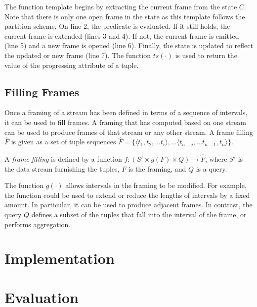 \documentclass{vldb}
\begin{document}
The function template begins by extracting the current frame from the state $C$. Note that there is only one open frame in the state as this template follows the partition scheme. On line 2, the predicate is evaluated. If it still holds, the current frame is extended (lines 3 and 4). If not, the current frame is emitted (line 5) and a new frame is opened (line 6). Finally, the state is updated to reflect the updated or new frame (line 7). The function $ts(\cdot)$ is used to return the value of the progressing attribute of a tuple.

\subsection{Filling Frames}

Once a framing of a stream has been defined in terms of a sequence of intervals, it can be used to fill frames. A framing that has computed based on one stream can be used to produce frames of that stream or any other stream. A frame filling $\hat{F}$ is given as a set of tuple sequences $\hat{F} = \{ \langle t_1, t_2, \ldots t_i \rangle, \ldots \langle t_{n-j}, \ldots t_{n-1}, t_n \rangle \}$.

\begin{definition}
A \emph{frame filling} is defined by a function $f: (S' \times g(F) \times Q) \rightarrow \hat{F}$, where $S'$ is the data stream furnishing the tuples, $F$ is the framing, and $Q$ is a query.
\end{definition}

The function $g(\cdot)$ allows intervals in the framing to be modified. For example, the function could be used to extend or reduce the lengths of intervals by a fixed amount. In particular, it can be used to produce adjacent frames. In contrast, the query $Q$ defines a subset of the tuples that fall into the interval of the frame, or performs aggregation.

\section{Implementation}
\label{sec:implementation}

\section{Evaluation}
\label{sec:evaluation}
\end{document}
